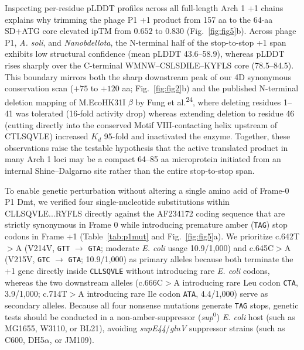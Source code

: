 \documentclass[10pt,letterpaper]{article}
\newcommand{\spname}[1]{\textit{#1}}
\newcommand{\gene}[1]{\textit{#1}}
\newcommand{\refsup}[1]{\textsuperscript{#1}}
\begin{document}
Inspecting per-residue pLDDT profiles across all full-length Arch 1 +1 chains explains why trimming the phage P1 +1 product from 157 aa to the 64-aa SD+ATG core elevated ipTM from $0.652$ to $0.830$ (Fig.~\ref{fig:fig5}b). Across phage P1, \spname{A. soli}, and \spname{Nanobdellota}, the N-terminal half of the stop-to-stop +1 span exhibits low structural confidence (mean pLDDT 43.6--58.9), whereas pLDDT rises sharply over the C-terminal WMNW--CSLSDILE--KYFLS core (78.5--84.5). This boundary mirrors both the sharp downstream peak of our 4D synonymous conservation scan ($+75$ to $+120$ aa; Fig.~\ref{fig:fig2}b) and the published N-terminal deletion mapping of M.EcoHK31I $\beta$ by Fung et al.\refsup{24}, where deleting residues 1--41 was tolerated (16-fold activity drop) whereas extending deletion to residue 46 (cutting directly into the conserved Motif VIII-contacting helix upstream of CTLSQVLE) increased $K_d$ 95-fold and inactivated the enzyme. Together, these observations raise the testable hypothesis that the active translated product in many Arch 1 loci may be a compact 64--85 aa microprotein initiated from an internal Shine--Dalgarno site rather than the entire stop-to-stop span.

To enable genetic perturbation without altering a single amino acid of Frame-0 P1 Dmt, we verified four single-nucleotide substitutions within CLLSQVLE...RYFLS directly against the AF234172 coding sequence that are strictly synonymous in Frame 0 while introducing premature amber (\texttt{TAG}) stop codons in Frame +1 (Table~\ref{tab:p1mut} and Fig.~\ref{fig:fig5}a). We prioritize c.642T$>$A (V214V, \texttt{GTT} $\rightarrow$ \texttt{GTA}; moderate \spname{E. coli} usage 10.9/1,000) and c.645C$>$A (V215V, \texttt{GTC} $\rightarrow$ \texttt{GTA}; 10.9/1,000) as primary alleles because both terminate the +1 gene directly inside \texttt{CLLSQVLE} without introducing rare \spname{E. coli} codons, whereas the two downstream alleles (c.666C$>$A introducing rare Leu codon \texttt{CTA}, 3.9/1,000; c.714T$>$A introducing rare Ile codon \texttt{ATA}, 4.4/1,000) serve as secondary alleles. Because all four nonsense mutations generate \texttt{TAG} stops, genetic tests should be conducted in a non-amber-suppressor (\gene{sup}$^0$) \spname{E. coli} host (such as MG1655, W3110, or BL21), avoiding \gene{supE44}/\gene{glnV} suppressor strains (such as C600, DH5$\alpha$, or JM109).
\end{document}

